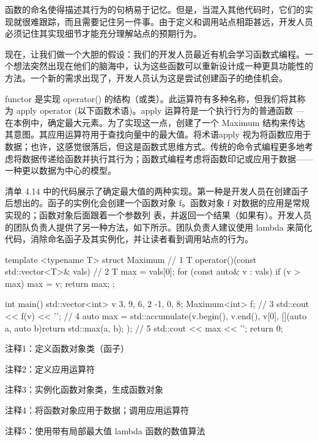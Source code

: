 
函数的命名使得描述其行为的句柄易于记忆。但是，当混入其他代码时，它们的实现就很难跟踪，而且需要记住另一件事。由于定义和调用站点相距甚远，开发人员必须记住其实现细节才能充分理解站点的预期行为。

现在，让我们做一个大胆的假设：我们的开发人员最近有机会学习函数式编程。一个想法突然出现在他们的脑海中，认为这些函数可以重新设计成一种更具功能性的方法。一个新的需求出现了，开发人员认为这是尝试创建函子的绝佳机会。

functor 是实现 operator() 的结构（或类）。此运算符有多种名称，但我们将其称为 apply operator (以下函数术语)。apply 运算符是一个执行行为的普通函数 — 在本例中，确定最大元素。为了实现这一点，创建了一个 Maximum 结构来传达其意图。其应用运算符用于查找向量中的最大值。将术语apply 视为将函数应用于数据；也许，这感觉很落后，但这是函数式思维方式。传统的命令式编程更多地考虑将数据传递给函数并执行其行为；函数式编程考虑将函数印记或应用于数据——一种更以数据为中心的模型。

清单 4.14 中的代码展示了确定最大值的两种实现。第一种是开发人员在创建函子后想出的。函子的实例化会创建一个函数对象 f。函数对象 f 对数据的应用是常规实现的；函数对象后面跟着一个参数列 表，并返回一个结果（如果有）。开发人员的团队负责人提供了另一种方法，如下所示。团队负责人建议使用 lambda 来简化代码，消除命名函子及其实例化，并让读者看到调用站点的行为。


\begin{cpp}
template <typename T>
struct Maximum { // 1
  T operator()(const std::vector<T>& vals) { // 2
    T max = vals[0];
    for (const auto& v : vals)
      if (v > max)
        max = v;
    return max;
  }
};

int main() {
  std::vector<int> v {3, 9, 6, 2 -1, 0, 8};
  Maximum<int> f; // 3
  std::cout << f(v) << '\n'; // 4
  auto max = std::accumulate(v.begin(), v.end(), v[0],
    [](auto a, auto b){return std::max(a, b); }); // 5
  std::cout << max << '\n';
  return 0;
}
\end{cpp}

{\footnotesize
注释1：定义函数对象类（函子）

注释2：定义应用运算符

注释3：实例化函数对象类，生成函数对象

注释4：将函数对象应用于数据；调用应用运算符

注释5：使用带有局部最大值 lambda 函数的数值算法
}


